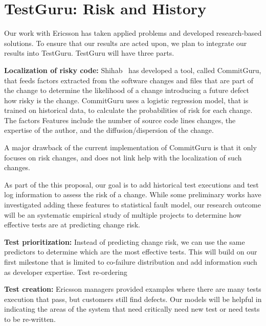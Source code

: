 \section{TestGuru: Risk and History}

Our work with Ericsson has taken applied problems and developed research-based solutions. To ensure that our results are acted upon, we plan to integrate our results into TestGuru. TestGuru will have three parts. 

\textbf{Localization of risky code:} Shihab~\cite{} has developed a tool, called CommitGuru, that feeds factors extracted from the software changes and files that are part of the change to determine the likelihood of a change introducing a future defect \ie how risky is the change. CommitGuru uses a logistic regression model, that is trained on historical data, to calculate the probabilities of risk for each change. The factors Features include the number of source code lines changes, the expertise of the author, and the diffusion/dispersion of the change. 

A major drawback of the current implementation of CommitGuru is that it only focuses on risk changes, and does not link help with the localization of such changes.

As part of the this proposal, our goal is to add historical test executions and test log information to assess the risk of a change. While some preliminary works have investigated adding these features to statistical fault model\cite{herzig,others}, our research outcome will be an systematic empirical study of multiple projects to determine how effective tests are at predicting change risk.

\textbf{Test prioritization:} Instead of predicting change risk, we can use the same predictors to determine which are the most effective tests. This will build on our first milestone that is limited to co-failure distribution and add information such as developer expertise.  Test re-ordering 

\textbf{Test creation:} Ericsson managers provided examples where there are many tests execution that pass, but customers still find defects. Our models will be helpful in indicating the areas of the system that need critically need new test or need tests to be re-written.


